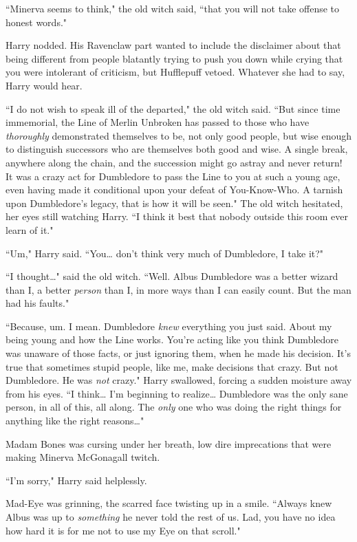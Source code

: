 ``Minerva seems to think," the old witch said, ``that you will not take offense to honest words."

Harry nodded. His Ravenclaw part wanted to include the disclaimer about that being different from people blatantly trying to push you down while crying that you were intolerant of criticism, but Hufflepuff vetoed. Whatever she had to say, Harry would hear.

``I do not wish to speak ill of the departed," the old witch said. ``But since time immemorial, the Line of Merlin Unbroken has passed to those who have \emph{thoroughly} demonstrated themselves to be, not only good people, but wise enough to distinguish successors who are themselves both good and wise. A single break, anywhere along the chain, and the succession might go astray and never return! It was a crazy act for Dumbledore to pass the Line to you at such a young age, even having made it conditional upon your defeat of You-Know-Who. A tarnish upon Dumbledore's legacy, that is how it will be seen." The old witch hesitated, her eyes still watching Harry. ``I think it best that nobody outside this room ever learn of it."

``Um," Harry said. ``You{\ldots} don't think very much of Dumbledore, I take it?"

``I thought{\ldots}" said the old witch. ``Well. Albus Dumbledore was a better wizard than I, a better \emph{person} than I, in more ways than I can easily count. But the man had his faults."

``Because, um. I mean. Dumbledore \emph{knew} everything you just said. About my being young and how the Line works. You're acting like you think Dumbledore was unaware of those facts, or just ignoring them, when he made his decision. It's true that sometimes stupid people, like me, make decisions that crazy. But not Dumbledore. He was \emph{not} crazy." Harry swallowed, forcing a sudden moisture away from his eyes. ``I think{\ldots} I'm beginning to realize{\ldots} Dumbledore was the only sane person, in all of this, all along. The \emph{only} one who was doing the right things for anything like the right reasons{\ldots}"

Madam Bones was cursing under her breath, low dire imprecations that were making Minerva McGonagall twitch.

``I'm sorry," Harry said helplessly.

Mad-Eye was grinning, the scarred face twisting up in a smile. ``Always knew Albus was up to \emph{something} he never told the rest of us. Lad, you have no idea how hard it is for me not to use my Eye on that scroll."

